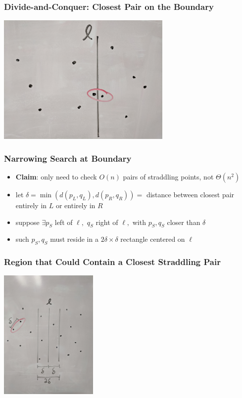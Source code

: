 \documentclass{beamer}
\begin{document}
\begin{frame} \frametitle{Divide-and-Conquer: Closest Pair on the Boundary}
  \begin{center}
    \includegraphics[height=2.5in]{closest-pair-on-boundary.jpg}
  \end{center}
\end{frame}

\begin{frame} \frametitle{Narrowing Search at Boundary}
\begin{itemize}
  \item \textbf{Claim}: only need to check $O(n)$ pairs of straddling points, not $\Theta(n^2)$
  \item let $\delta = \min(d(p_L, q_L), d(p_R, q_R)) = $ distance between closest
    pair entirely in $L$ or entirely in $R$
  \item suppose $\exists p_S$ left of $\ell,$ $q_S$ right of $\ell,$ with $p_S, q_S$ closer than $\delta$
  \item such $p_S, q_S$ must reside in a $2\delta \times \delta$ rectangle centered on $\ell$
\end{itemize}
\end{frame}

\begin{frame} \frametitle{Region that Could Contain a Closest Straddling Pair}
  \begin{center}
    \includegraphics[height=2.5in]{closest-pair-straddling.jpg}
  \end{center}
\end{frame}
\end{document}
